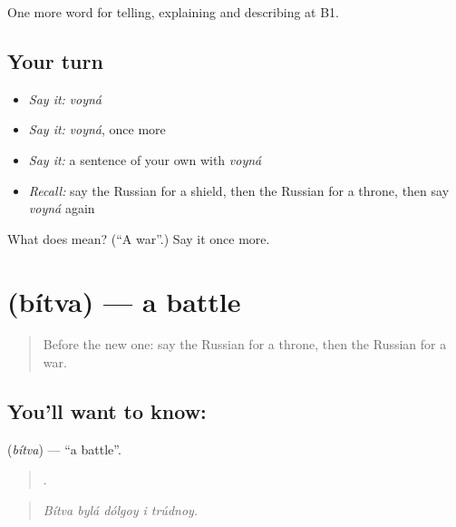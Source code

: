 \begin{grammarlens}[title={What you've built}]
One more word for telling, explaining and describing at B1.
\end{grammarlens}

\subsection*{Your turn}
\begin{itemize}
\raggedright
  \item \emph{Say it:} \emph{voyná}
  \item \emph{Say it:} \emph{voyná}, once more
  \item \emph{Say it:} a sentence of your own with \emph{voyná}
  \item \emph{Recall:} say the Russian for a shield, then the Russian for a throne, then say \emph{voyná} again
\end{itemize}

\begin{tcolorbox}[breakable,colback=teal!4,colframe=teal!35!black,title={Before you move on}]
What does  mean? (\textquotedblleft{}A war\textquotedblright{}.) Say it once more.
\end{tcolorbox}
\section[\texorpdfstring{\ru{битва} (bítva)}{битва (bítva)}]{ (bítva) — a battle}

\label{lesson:RU-C323-bitva}



\begin{quote}
Before the new one: say the Russian for a throne, then the Russian for a war.
\end{quote}

\subsection*{You'll want to know: }
\textbf{} (\emph{bítva}) — \textquotedblleft{}a battle\textquotedblright{}.

\begin{quote}
    .
\end{quote}

\begin{quote}
\emph{Bítva bylá dólgoy i trúdnoy.}
\end{quote}

